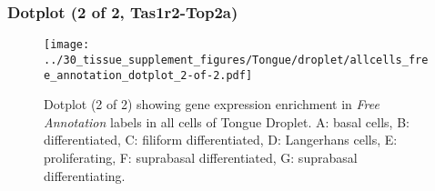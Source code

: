\clearpage

\subsubsection{Dotplot (2 of 2, Tas1r2-Top2a)}
\begin{figure}[h]
\centering
\texttt{[image: ../30\_tissue\_supplement\_figures/Tongue/droplet/allcells\_free\_annotation\_dotplot\_2-of-2.pdf]}

\caption{ Dotplot (2 of 2)  showing gene expression enrichment in \emph{Free Annotation} labels in all cells of Tongue Droplet. A: basal cells, B: differentiated, C: filiform differentiated, D: Langerhans cells, E: proliferating, F: suprabasal differentiated, G: suprabasal differentiating.}
\end{figure}

